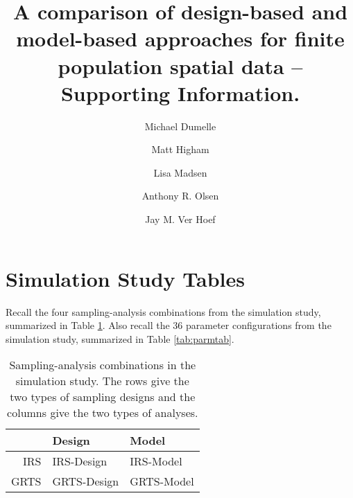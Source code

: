 \documentclass[]{elsarticle} %
\begin{document}
\begin{frontmatter}

  \title{A comparison of design-based and model-based approaches for
finite population spatial data -- Supporting Information.}
    \author[USEPA]{Michael Dumelle}
  
    \author[STLAW]{Matt Higham}
  
    \author[OSU]{Lisa Madsen}
  
    \author[USEPA]{Anthony R. Olsen}
  
    \author[NOAA]{Jay M. Ver Hoef}
  
      \address[USEPA]{United States Environmental Protection Agency, 200
SW 35th St, Corvallis, Oregon, 97333}
    \address[STLAW]{Saint Lawrence University Department of Mathematics,
Computer Science, and Statistics, 23 Romoda Drive, Canton, New York,
13617}
    \address[OSU]{Oregon State University Department of Statistics, 239
Weniger Hall, Corvallis, Oregon, 97331}
    \address[NOAA]{Marine Mammal Laboratory, Alaska Fisheries Science
Center, National Oceanic and Atmospheric Administration, Seattle,
Washington, 98115}
  
  \begin{abstract}
  
  \end{abstract}
  
 \end{frontmatter}

\hypertarget{sec:simtabs}{%
\section{Simulation Study Tables}\label{sec:simtabs}}

Recall the four sampling-analysis combinations from the simulation
study, summarized in Table \ref{tab:designanalysis}. Also recall the 36
parameter configurations from the simulation study, summarized in Table
\ref{tab:parmtab}.

\begin{table}[ht]
\centering
\begin{tabular}{r|ll}
  \hline
 & Design & Model \\ 
  \hline
IRS & IRS-Design & IRS-Model \\ 
  GRTS & GRTS-Design & GRTS-Model \\ 
   \hline
\end{tabular}
\caption{\label{tab:designanalysis} Sampling-analysis combinations in the simulation study. The rows give the two types of sampling designs and the columns give the two types of analyses.} 
\end{table}
\end{document}
